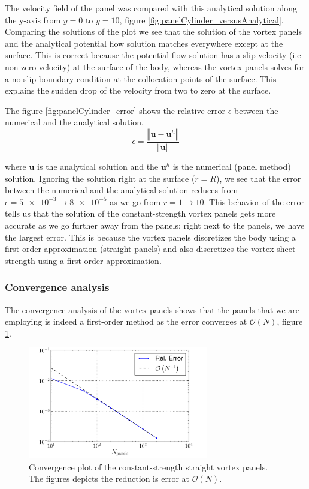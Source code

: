 The velocity field of the panel was compared with this analytical solution along the y-axis from $y=0$ to $y=10$, figure \ref{fig:panelCylinder_versusAnalytical}. Comparing the solutions of the plot we see that the solution of the vortex panels and the analytical potential flow solution matches everywhere except at the surface. This is correct because the potential flow solution has a slip velocity (i.e non-zero velocity) at the surface of the body, whereas the vortex panels solves for a no-slip boundary condition at the collocation points of the surface. This explains the sudden drop of the velocity from two to zero at the surface.	

The figure \ref{fig:panelCylinder_error} shows the relative error $\epsilon$ between the numerical and the analytical solution,
	\begin{equation}
	\epsilon = \frac{\left\Vert\mathbf{u}-\mathbf{u}^h\right\Vert}{\left\Vert\mathbf{u}\right\Vert}
	\label{eq:panelRelativeError}
	\end{equation}
	
where $\mathbf{u}$ is the analytical solution and the $\mathbf{u}^h$ is the numerical (panel method) solution. Ignoring the solution right at the surface ($r=R$), we see that the error between the numerical and the analytical solution reduces from $\epsilon=\num{5e-3}\rightarrow \num{8e-5}$ as we go from $r=1\rightarrow10$. This behavior of the error tells us that the solution of the constant-strength vortex panels gets more accurate as we go further away from the panels; right next to the panels, we have the largest error. This is because the vortex panels discretizes the body using a first-order approximation (straight panels) and also discretizes the vortex sheet strength using a first-order approximation. 

\subsubsection*{Convergence analysis}

The convergence analysis of the vortex panels shows that the panels that we are employing is indeed a first-order method as the error converges at $\mathcal{O}\left(N\right)$, figure \ref{fig:panelCylinder_convergence}.

	\begin{figure}[!t]
	\centering
	\includegraphics[width=0.7\textwidth]{figures/lagrangian/panelCylinder_convergence_compressed.pdf}
	\caption{Convergence plot of the constant-strength straight vortex panels. The figures depicts the reduction is error at $\mathcal{O}\left(N\right)$.}
	\label{fig:panelCylinder_convergence}
	\end{figure}

